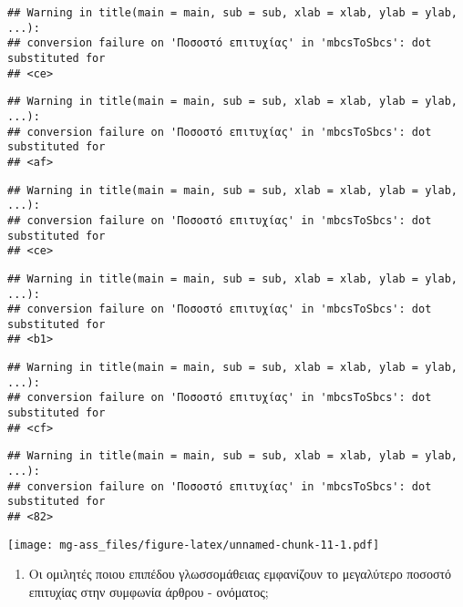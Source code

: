 \documentclass[
]{article}
\providecommand{\tightlist}{%
  \setlength{\itemsep}{0pt}\setlength{\parskip}{0pt}}
\begin{document}
\begin{verbatim}
## Warning in title(main = main, sub = sub, xlab = xlab, ylab = ylab, ...):
## conversion failure on 'Ποσοστό επιτυχίας' in 'mbcsToSbcs': dot substituted for
## <ce>
\end{verbatim}

\begin{verbatim}
## Warning in title(main = main, sub = sub, xlab = xlab, ylab = ylab, ...):
## conversion failure on 'Ποσοστό επιτυχίας' in 'mbcsToSbcs': dot substituted for
## <af>
\end{verbatim}

\begin{verbatim}
## Warning in title(main = main, sub = sub, xlab = xlab, ylab = ylab, ...):
## conversion failure on 'Ποσοστό επιτυχίας' in 'mbcsToSbcs': dot substituted for
## <ce>
\end{verbatim}

\begin{verbatim}
## Warning in title(main = main, sub = sub, xlab = xlab, ylab = ylab, ...):
## conversion failure on 'Ποσοστό επιτυχίας' in 'mbcsToSbcs': dot substituted for
## <b1>
\end{verbatim}

\begin{verbatim}
## Warning in title(main = main, sub = sub, xlab = xlab, ylab = ylab, ...):
## conversion failure on 'Ποσοστό επιτυχίας' in 'mbcsToSbcs': dot substituted for
## <cf>
\end{verbatim}

\begin{verbatim}
## Warning in title(main = main, sub = sub, xlab = xlab, ylab = ylab, ...):
## conversion failure on 'Ποσοστό επιτυχίας' in 'mbcsToSbcs': dot substituted for
## <82>
\end{verbatim}

\texttt{[image: mg-ass\_files/figure-latex/unnamed-chunk-11-1.pdf]}

\begin{enumerate}
\def\labelenumi{\arabic{enumi})}
\setcounter{enumi}{4}
\tightlist
\item
  Οι ομιλητές ποιου επιπέδου γλωσσομάθειας εμφανίζουν το μεγαλύτερο
  ποσοστό επιτυχίας στην συμφωνία άρθρου - ονόματος;
\end{enumerate}
\end{document}
